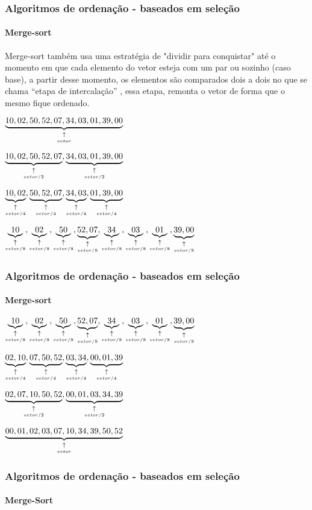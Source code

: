 \begin{frame}
	\frametitle{Algoritmos de ordenação - baseados em seleção}
	\framesubtitle{Merge-sort}
	\par  Merge-sort também usa uma estratégia de "dividir  para conquistar" até o momento em que cada elemento do vetor esteja com um par ou sozinho (caso base), a partir desse momento, os elementos são comparados dois a dois no que se chama “etapa de intercalação” , essa etapa, remonta o vetor de forma que o mesmo fique ordenado.
	\par $\underset{\underset{vetor}{\uparrow}}{\mathbf{\underbrace{10,02,50,52,07,34,03,01,39,00}}}$
	\par $\underset{\underset{vetor/2}{\uparrow}}{\mathbf{\underbrace{10,02,50,52,07}}},\underset{\underset{vetor/2}{\uparrow}}{\mathbf{\underbrace{34,03,01,39,00}}}$
	\par $\underset{\underset{vetor/4}{\uparrow}}{\mathbf{\underbrace{10,02}}},\underset{\underset{vetor/4}{\uparrow}}{\mathbf{\underbrace{50,52,07}}},\underset{\underset{vetor/4}{\uparrow}}{\mathbf{\underbrace{34,03}}},\underset{\underset{vetor/4}{\uparrow}}{\mathbf{\underbrace{01,39,00}}}$
	\par $\underset{\underset{vetor/8}{\uparrow}}{\mathbf{\underbrace{10}}},\underset{\underset{vetor/8}{\uparrow}}{\mathbf{\underbrace{02}}},\underset{\underset{vetor/8}{\uparrow}}{\mathbf{\underbrace{50}}},\underset{\underset{vetor/8}{\uparrow}}{\mathbf{\underbrace{52,07}}},\underset{\underset{vetor/8}{\uparrow}}{\mathbf{\underbrace{34}}},\underset{\underset{vetor/8}{\uparrow}}{\mathbf{\underbrace{03}}},\underset{\underset{vetor/8}{\uparrow}}{\mathbf{\underbrace{01}}},\underset{\underset{vetor/8}{\uparrow}}{\mathbf{\underbrace{39,00}}}$
\end{frame}

\begin{frame}
	\frametitle{Algoritmos de ordenação - baseados em seleção}
	\framesubtitle{Merge-sort}
	\par $\underset{\underset{vetor/8}{\uparrow}}{\mathbf{\underbrace{10}}},\underset{\underset{vetor/8}{\uparrow}}{\mathbf{\underbrace{02}}},\underset{\underset{vetor/8}{\uparrow}}{\mathbf{\underbrace{50}}},\underset{\underset{vetor/8}{\uparrow}}{\mathbf{\underbrace{52,07}}},\underset{\underset{vetor/8}{\uparrow}}{\mathbf{\underbrace{34}}},\underset{\underset{vetor/8}{\uparrow}}{\mathbf{\underbrace{03}}},\underset{\underset{vetor/8}{\uparrow}}{\mathbf{\underbrace{01}}},\underset{\underset{vetor/8}{\uparrow}}{\mathbf{\underbrace{39,00}}}$
	\par $\underset{\underset{vetor/4}{\uparrow}}{\mathbf{\underbrace{02,10}}},\underset{\underset{vetor/4}{\uparrow}}{\mathbf{\underbrace{07,50,52}}},\underset{\underset{vetor/4}{\uparrow}}{\mathbf{\underbrace{03,34}}},\underset{\underset{vetor/4}{\uparrow}}{\mathbf{\underbrace{00,01,39}}}$
	\par $\underset{\underset{vetor/2}{\uparrow}}{\mathbf{\underbrace{02,07,10,50,52}}},\underset{\underset{vetor/2}{\uparrow}}{\mathbf{\underbrace{00,01,03,34,39}}}$
	\par $\underset{\underset{vetor}{\uparrow}}{\mathbf{\underbrace{00,01,02,03,07,10,34,39,50,52}}}$
\end{frame}

\begin{frame}
	\frametitle{Algoritmos de ordenação - baseados em seleção}
	\framesubtitle{Merge-Sort}
	
\end{frame}

